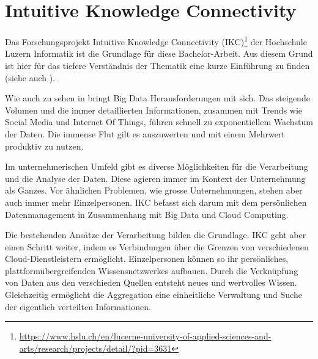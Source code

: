 






\section{Intuitive Knowledge Connectivity}\label{s-ikc}


Das Forschungsprojekt Intuitive Knowledge Connectivity (IKC)\footnote{\url{https://www.hslu.ch/en/lucerne-university-of-applied-sciences-and-arts/research/projects/detail/?pid=3631}} der Hochschule Luzern Informatik ist die Grundlage für diese Bachelor-Arbeit. Aus diesem Grund ist hier für das tiefere Verständnis der Thematik eine kurze Einführung zu finden (siehe auch \cite{kaufmann2016intuitive}).

Wie auch zu sehen in \cite{manyika2011big} bringt Big Data Herausforderungen mit sich. Das steigende Volumen und die immer detaillierten Informationen, zusammen mit Trends wie Social Media und Internet Of Things, führen schnell zu exponentiellem Wachstum der Daten. Die immense Flut gilt es auszuwerten und mit einem Mehrwert produktiv zu nutzen.

Im unternehmerischen Umfeld gibt es diverse Möglichkeiten für die Verarbeitung und die Analyse der Daten. Diese agieren immer im Kontext der Unternehmung als Ganzes. Vor ähnlichen Problemen, wie grosse Unternehmungen, stehen aber auch immer mehr Einzelpersonen. IKC befasst sich darum mit dem persönlichen Datenmanagement in Zusammenhang mit Big Data und Cloud Computing.

Die bestehenden Ansätze der Verarbeitung bilden die Grundlage. IKC geht aber einen Schritt weiter, indem es Verbindungen über die Grenzen von verschiedenen Cloud-Dienstleistern ermöglicht. Einzelpersonen können so ihr persönliches, plattformübergreifenden Wis\-sens\-netz\-werkes aufbauen. Durch die Verknüpfung von Daten aus den verschieden Quellen entsteht neues und wertvolles Wissen. Gleichzeitig ermöglicht die Aggregation eine einheitliche Verwaltung und Suche der eigentlich verteilten Informationen.

